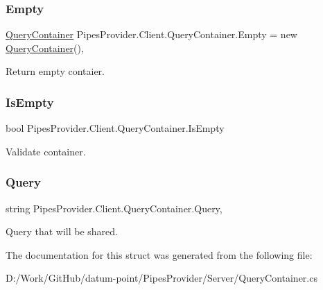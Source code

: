 \subsubsection{\texorpdfstring{Empty}{Empty}}
{\footnotesize\ttfamily \mbox{\hyperlink{struct_pipes_provider_1_1_client_1_1_query_container}{Query\+Container}} Pipes\+Provider.\+Client.\+Query\+Container.\+Empty = new \mbox{\hyperlink{struct_pipes_provider_1_1_client_1_1_query_container}{Query\+Container}}()\hspace{0.3cm}{\ttfamily [static]}, {\ttfamily [get]}}



Return empty contaier. 

\mbox{\label{struct_pipes_provider_1_1_client_1_1_query_container_ab2ceeaac61f04d4ce7e41bc8ea931a0f}} 
\subsubsection{\texorpdfstring{Is\+Empty}{IsEmpty}}
{\footnotesize\ttfamily bool Pipes\+Provider.\+Client.\+Query\+Container.\+Is\+Empty\hspace{0.3cm}{\ttfamily [get]}}



Validate container. 

\mbox{\label{struct_pipes_provider_1_1_client_1_1_query_container_ada0fa04c68e6aee41d3d811d699d01aa}} 
\subsubsection{\texorpdfstring{Query}{Query}}
{\footnotesize\ttfamily string Pipes\+Provider.\+Client.\+Query\+Container.\+Query\hspace{0.3cm}{\ttfamily [get]}, {\ttfamily [set]}}



Query that will be shared. 



The documentation for this struct was generated from the following file\+:\begin{DoxyCompactItemize}
\item 
D\+:/\+Work/\+Git\+Hub/datum-\/point/\+Pipes\+Provider/\+Server/Query\+Container.\+cs\end{DoxyCompactItemize}
